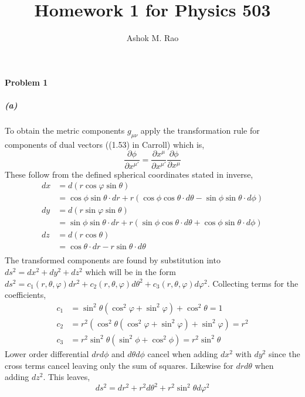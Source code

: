 \documentclass[12pt]{scrartcl}
\title{Homework 1 for Physics  503}
\author{Ashok M. Rao}
\begin{document}
\maketitle
{}

\paragraph{Problem 1}
\subparagraph{(a)} 
To obtain the metric components $g_{\mu\nu}$ apply the transformation rule for components of dual vectors ((1.53) in Carroll) which is,
\[\frac{\partial\phi}{\partial x^{\mu'}} = \frac{\partial x^{\mu}}{\partial x^{\mu'}}\frac{\partial \phi}{\partial x^{\mu}} \]
These follow from the defined spherical coordinates stated in inverse,
\begin{align*}
	dx &= d(r\cos\varphi \sin\theta) \\&= \cos\phi\sin\theta\cdot dr + r(\cos\phi\cos\theta\cdot d\theta - \sin\phi\sin\theta\cdot d\phi) \\ 
	dy &= d(r\sin\varphi \sin\theta) \\&= \sin\phi\sin\theta\cdot dr + r(\sin\phi\cos\theta\cdot d\theta + \cos\phi\sin\theta\cdot d\phi) \\
	dz &= d(r\cos\theta) \\&= \cos\theta \cdot dr - r\sin\theta\cdot d\theta \\
\end{align*}
The transformed components are found by substitution into $ds^2 = dx^2 + dy^2 + dz^2$ which will be in the form $ds^2 = c_1(r, \theta, \varphi)  dr^2 + c_2(r, \theta, \varphi) d\theta^2 + c_3(r, \theta, \varphi) d\varphi^2$. Collecting terms for the coefficients,
\begin{align*}
	c_1 &= \sin^2\theta (\cos^2\varphi + \sin^2\varphi) + \cos^2\theta = 1\\
	c_2 &= r^2(\cos^2\theta (\cos^2\varphi + \sin^2\varphi) + \sin^2\varphi) = r^2 \\
	c_3 &= r^2\sin^2\theta(\sin^2\phi + \cos^2\phi) = r^2\sin^2\theta 
\end{align*}
Lower order differential $dr d\phi$ and $d\theta d\phi$ cancel when adding $dx^2$ with $dy^2$ since the cross terms cancel leaving only the sum of squares. Likewise for $dr d\theta$ when adding $d z^2$. This leaves,
\[ds^2 = dr^2 + r^2 d\theta^2 + r^2 \sin^2\theta d\varphi^2\]
\end{document}
